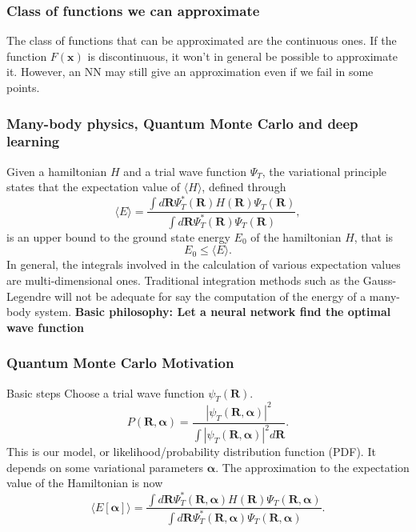 \documentclass{beamer}
\begin{document}
\begin{frame}
\frametitle{Class of functions we can approximate}

\begin{block}{}
The class of functions that can be approximated are the continuous ones.
If the function $F(\bm{x})$ is discontinuous, it won't in general be possible to approximate it. However, an NN may still give an approximation even if we fail in some points.
\end{block}
\end{frame}

\begin{frame}
\frametitle{Many-body physics, Quantum Monte Carlo and deep learning}

\begin{block}{}
Given a hamiltonian $H$ and a trial wave function $\Psi_T$, the variational principle states that the expectation value of $\langle H \rangle$, defined through 
\[
   \langle E \rangle =
   \frac{\int d\bm{R}\Psi^{\ast}_T(\bm{R})H(\bm{R})\Psi_T(\bm{R})}
        {\int d\bm{R}\Psi^{\ast}_T(\bm{R})\Psi_T(\bm{R})},
\]
is an upper bound to the ground state energy $E_0$ of the hamiltonian $H$, that is 
\[
    E_0 \le \langle E \rangle.
\]
In general, the integrals involved in the calculation of various  expectation values  are multi-dimensional ones. Traditional integration methods such as the Gauss-Legendre will not be adequate for say the  computation of the energy of a many-body system.  \textbf{Basic philosophy: Let a neural network find the optimal wave function}
\end{block}
\end{frame}

\begin{frame}
\frametitle{Quantum Monte Carlo Motivation}

\begin{block}{Basic steps }
Choose a trial wave function
$\psi_T(\bm{R})$.
\[
   P(\bm{R},\bm{\alpha})= \frac{\left|\psi_T(\bm{R},\bm{\alpha})\right|^2}{\int \left|\psi_T(\bm{R},\bm{\alpha})\right|^2d\bm{R}}.
\]
This is our model, or likelihood/probability distribution function  (PDF). It depends on some variational parameters $\bm{\alpha}$.
The approximation to the expectation value of the Hamiltonian is now 
\[
   \langle E[\bm{\alpha}] \rangle = 
   \frac{\int d\bm{R}\Psi^{\ast}_T(\bm{R},\bm{\alpha})H(\bm{R})\Psi_T(\bm{R},\bm{\alpha})}
        {\int d\bm{R}\Psi^{\ast}_T(\bm{R},\bm{\alpha})\Psi_T(\bm{R},\bm{\alpha})}.
\]
\end{block}
\end{frame}
\end{document}
